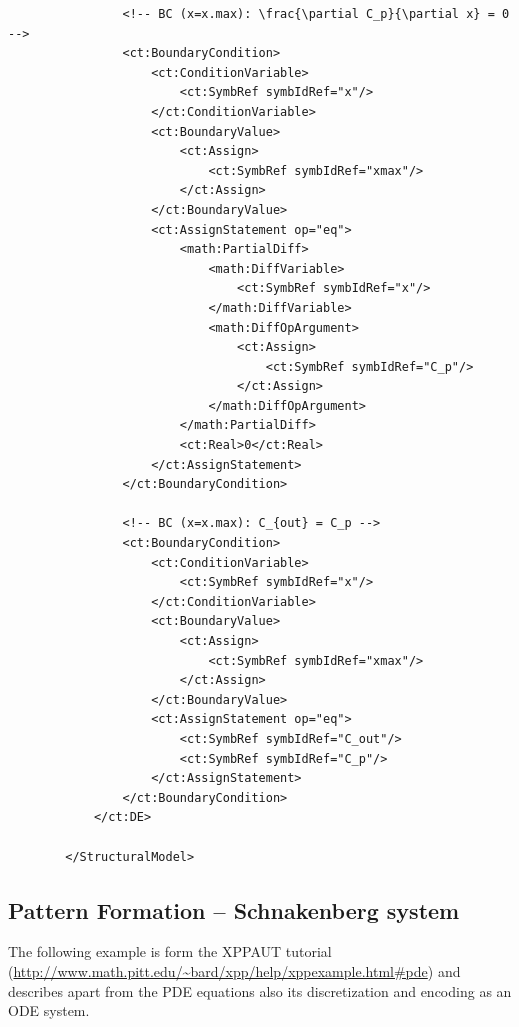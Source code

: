 \begin{lstlisting}
                <!-- BC (x=x.max): \frac{\partial C_p}{\partial x} = 0 -->                
                <ct:BoundaryCondition>
                    <ct:ConditionVariable>
                        <ct:SymbRef symbIdRef="x"/>
                    </ct:ConditionVariable>
                    <ct:BoundaryValue>
                        <ct:Assign>
                            <ct:SymbRef symbIdRef="xmax"/>
                        </ct:Assign>
                    </ct:BoundaryValue>
                    <ct:AssignStatement op="eq">
                        <math:PartialDiff>
                            <math:DiffVariable>
                                <ct:SymbRef symbIdRef="x"/>
                            </math:DiffVariable>
                            <math:DiffOpArgument>
                                <ct:Assign>
                                    <ct:SymbRef symbIdRef="C_p"/>
                                </ct:Assign>
                            </math:DiffOpArgument>
                        </math:PartialDiff>
                        <ct:Real>0</ct:Real>
                    </ct:AssignStatement>
                </ct:BoundaryCondition>
                
                <!-- BC (x=x.max): C_{out} = C_p -->
                <ct:BoundaryCondition>
                    <ct:ConditionVariable>
                        <ct:SymbRef symbIdRef="x"/>
                    </ct:ConditionVariable>
                    <ct:BoundaryValue>
                        <ct:Assign>
                            <ct:SymbRef symbIdRef="xmax"/>
                        </ct:Assign>
                    </ct:BoundaryValue>
                    <ct:AssignStatement op="eq">
                        <ct:SymbRef symbIdRef="C_out"/>
                        <ct:SymbRef symbIdRef="C_p"/>
                    </ct:AssignStatement>
                </ct:BoundaryCondition>
            </ct:DE>
            
        </StructuralModel>
\end{lstlisting}


\bigskip
\subsection{Pattern Formation -- Schnakenberg system}
\label{subsec:XPPexample}
The following example is form the XPPAUT tutorial (\url{http://www.math.pitt.edu/~bard/xpp/help/xppexample.html#pde}) and describes apart from the PDE equations also its discretization and 
encoding as an ODE system.

